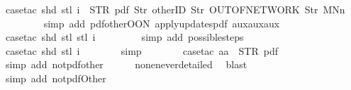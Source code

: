 \begin{isabellebody}
\ {\isacharparenleft}case{\isacharunderscore}tac\ {\isachardoublequoteopen}shd\ {\isacharparenleft}stl\ i{\isacharparenright}\ {\isacharequal}\ {\isacharparenleft}STR\ {\isacharprime}{\isacharprime}pdf{\isacharprime}{\isacharprime}{\isacharcomma}\ {\isacharbrackleft}Str\ {\isacharprime}{\isacharprime}otherID{\isacharprime}{\isacharprime}{\isacharcomma}\ Str\ {\isacharprime}{\isacharprime}OUT{\isacharunderscore}OF{\isacharunderscore}NETWORK{\isacharprime}{\isacharprime}{\isacharcomma}\ Str\ {\isacharprime}{\isacharprime}MNn{}{\isacharprime}{\isacharprime}{\isacharbrackright}{\isacharparenright}{\isachardoublequoteclose}{\isacharparenright}\isanewline
\ \ \ \ \ \ \ \isamarkupfalse%
\ {\isacharparenleft}simp\ add{\isacharcolon}\ pdf{\isacharunderscore}other{\isacharunderscore}OON\ apply{\isacharunderscore}updates{\isacharunderscore}pdf{}\ aux{}{\isacharunderscore}aux{}{\isacharunderscore}aux{}{\isacharparenright}\isanewline
\ \ \ \ \ \ \ \isamarkupfalse%
\ {\isacharparenleft}case{\isacharunderscore}tac\ {\isachardoublequoteopen}shd\ {\isacharparenleft}stl\ {\isacharparenleft}stl\ i{\isacharparenright}{\isacharparenright}{\isachardoublequoteclose}{\isacharparenright}\isanewline
\ \ \ \ \ \ \ \isamarkupfalse%
\ {\isacharparenleft}simp\ add{\isacharcolon}\ possible{\isacharunderscore}steps{\isacharunderscore}{}{\isacharparenright}\isanewline
\isanewline
\ \ \ \ \ \ \isamarkupfalse%
\ {\isacharparenleft}case{\isacharunderscore}tac\ {\isachardoublequoteopen}shd\ {\isacharparenleft}stl\ i{\isacharparenright}{\isachardoublequoteclose}{\isacharparenright}\isanewline
\ \ \ \ \ \ \isamarkupfalse%
\ simp\isanewline
\ \ \ \ \ \ \isamarkupfalse%
\ {\isacharparenleft}case{\isacharunderscore}tac\ {\isachardoublequoteopen}aa\ {\isacharequal}\ STR\ {\isacharprime}{\isacharprime}pdf{\isacharprime}{\isacharprime}{\isachardoublequoteclose}{\isacharparenright}\isanewline
\ \ \ \ \ \ \ \isamarkupfalse%
\ {\isacharparenleft}simp\ add{\isacharcolon}\ not{\isacharunderscore}pdf{\isacharunderscore}other{\isacharparenright}\isanewline
\ \ \ \ \isamarkupfalse%
\ none{\isacharunderscore}never{\isacharunderscore}detailed\ \isamarkupfalse%
\ blast\isanewline
\ \ \ \ \ \ \isamarkupfalse%
\ {\isacharparenleft}simp\ add{\isacharcolon}\ not{\isacharunderscore}pdfOther{\isacharunderscore}{}{\isacharparenright}\isanewline
\ \ \ \ \isamarkupfalse%

\end{isabellebody}
